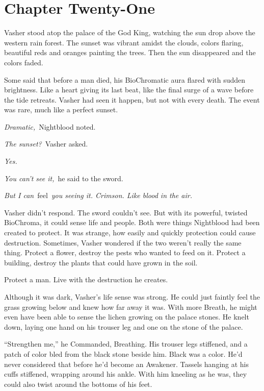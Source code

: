 \section{Chapter Twenty-One}

Vasher stood atop the palace of the God King, watching the sun drop above the western rain forest. The sunset was vibrant amidst the clouds, colors flaring, beautiful reds and oranges painting the trees. Then the sun disappeared and the colors faded.

Some said that before a man died, his BioChromatic aura flared with sudden brightness. Like a heart giving its last beat, like the final surge of a wave before the tide retreats. Vasher had seen it happen, but not with every death. The event was rare, much like a perfect sunset.

\textit{Dramatic,}~Nightblood noted.

\textit{The sunset?}~Vasher asked.

\textit{Yes.}

\textit{You can’t see it,}~he said to the sword.

\textit{But I can}~feel~\textit{you seeing it. Crimson. Like blood in the air.}

Vasher didn’t respond. The sword couldn’t see. But with its powerful, twisted BioChroma, it could sense life and people. Both were things Nightblood had been created to protect. It was strange, how easily and quickly protection could cause destruction. Sometimes, Vasher wondered if the two weren’t really the same thing. Protect a flower, destroy the pests who wanted to feed on it. Protect a building, destroy the plants that could have grown in the soil.

Protect a man. Live with the destruction he creates.

Although it was dark, Vasher’s life sense was strong. He could just faintly feel the grass growing below and knew how far away it was. With more Breath, he might even have been able to sense the lichen growing on the palace stones. He knelt down, laying one hand on his trouser leg and one on the stone of the palace.

“Strengthen me,” he Commanded, Breathing. His trouser legs stiffened, and a patch of color bled from the black stone beside him. Black was a color. He’d never considered that before he’d become an Awakener. Tassels hanging at his cuffs stiffened, wrapping around his ankle. With him kneeling as he was, they could also twist around the bottoms of his feet.

